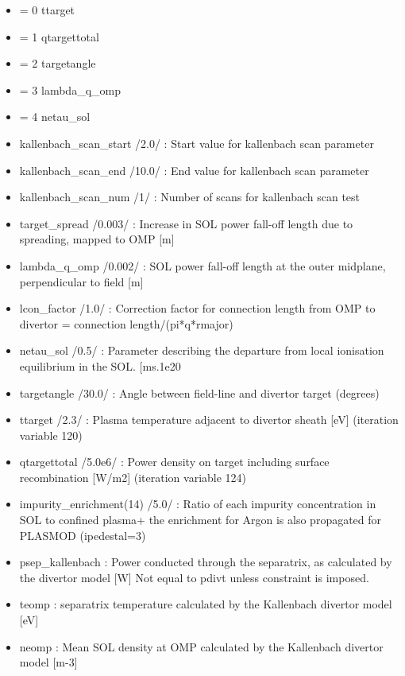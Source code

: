 \documentclass[
]{article}
\providecommand{\tightlist}{%
  \setlength{\itemsep}{0pt}\setlength{\parskip}{0pt}}
\begin{document}
\begin{itemize}
  \begin{itemize}
  \tightlist
  \item
    = 0 ttarget
  \item
    = 1 qtargettotal
  \item
    = 2 targetangle
  \item
    = 3 lambda\_q\_omp
  \item
    = 4 netau\_sol
  \item
    kallenbach\_scan\_start /2.0/ : Start value for kallenbach scan
    parameter
  \item
    kallenbach\_scan\_end /10.0/ : End value for kallenbach scan
    parameter
  \item
    kallenbach\_scan\_num /1/ : Number of scans for kallenbach scan test
  \item
    target\_spread /0.003/ : Increase in SOL power fall-off length due
    to spreading, mapped to OMP {[}m{]}
  \item
    lambda\_q\_omp /0.002/ : SOL power fall-off length at the outer
    midplane, perpendicular to field {[}m{]}
  \item
    lcon\_factor /1.0/ : Correction factor for connection length from
    OMP to divertor = connection length/(pi*q*rmajor)
  \item
    netau\_sol /0.5/ : Parameter describing the departure from local
    ionisation equilibrium in the SOL. {[}ms.1e20
  \item
    targetangle /30.0/ : Angle between field-line and divertor target
    (degrees)
  \item
    ttarget /2.3/ : Plasma temperature adjacent to divertor sheath
    {[}eV{]} (iteration variable 120)
  \item
    qtargettotal /5.0e6/ : Power density on target including surface
    recombination {[}W/m2{]} (iteration variable 124)
  \item
    impurity\_enrichment(14) /5.0/ : Ratio of each impurity
    concentration in SOL to confined plasma+ the enrichment for Argon is
    also propagated for PLASMOD (ipedestal=3)
  \item
    psep\_kallenbach : Power conducted through the separatrix, as
    calculated by the divertor model {[}W{]} Not equal to pdivt unless
    constraint is imposed.
  \item
    teomp : separatrix temperature calculated by the Kallenbach divertor
    model {[}eV{]}
  \item
    neomp : Mean SOL density at OMP calculated by the Kallenbach
    divertor model {[}m-3{]}

\end{itemize}
\end{itemize}
\end{document}
